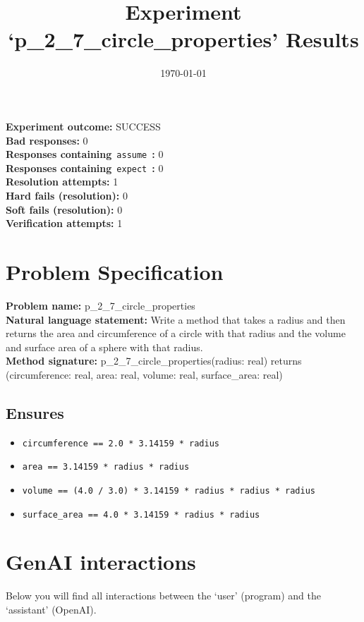 \documentclass{article}
\begin{document}
\title{Experiment `p\_2\_7\_circle\_properties' Results}
\author{\today}
\date{}
\maketitle
\textbf{Experiment outcome: }SUCCESS
\\\textbf{Bad responses: }0
\\\textbf{Responses containing}~\texttt{assume}~\textbf{: }0
\\\textbf{Responses containing}~\texttt{expect}~\textbf{: }0
\\\textbf{Resolution attempts: }1
\\\textbf{Hard fails (resolution): }0
\\\textbf{Soft fails (resolution): }0
\\\textbf{Verification attempts: }1
\section*{Problem Specification}
\textbf{Problem name: }p\_2\_7\_circle\_properties
\\\textbf{Natural language statement: }Write a method that takes a radius and then returns the area and circumference of a circle with that radius and the volume and surface area of a sphere with that radius.
\\\textbf{Method signature: }p\_2\_7\_circle\_properties(radius: real) returns (circumference: real, area: real, volume: real, surface\_area: real)
\subsection*{Ensures}
\begin{itemize}
\item \texttt{circumference == 2.0 * 3.14159 * radius}
\item \texttt{area == 3.14159 * radius * radius}
\item \texttt{volume == (4.0 / 3.0) * 3.14159 * radius * radius * radius}
\item \texttt{surface\_area == 4.0 * 3.14159 * radius * radius}
\end{itemize}
\clearpage
\section*{GenAI interactions}
Below you will find all interactions between the `user' (program) and the `assistant' (OpenAI).
\end{document}
